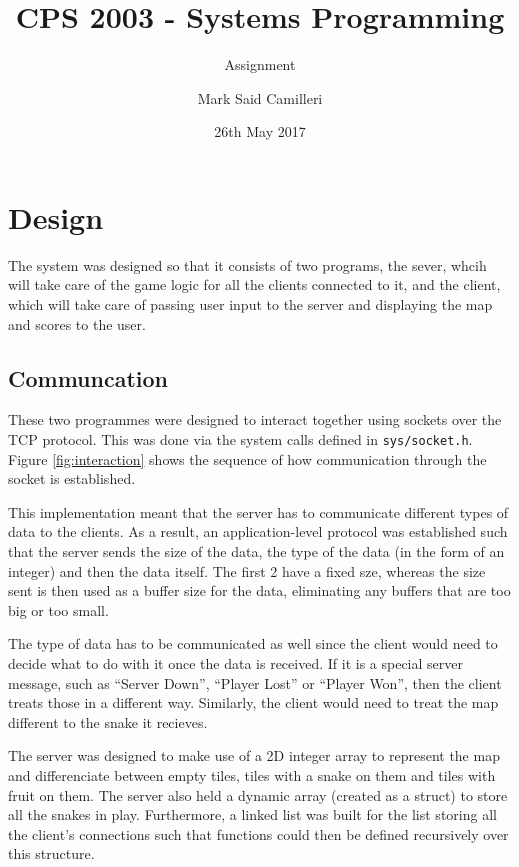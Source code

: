 \documentclass[programming,a4paper,12pt,twosided]{myassignment}
\title{CPS 2003 - Systems Programming}
\subtitle{Assignment}
\author{Mark Said Camilleri}
\date{26th May 2017}
\begin{document}
\maketitle
{}
\tableofcontents
\chapter{Design}
The system was designed so that it consists of two programs, the sever, whcih will take care of the game logic for all the clients connected to it, and the client, which will take care of passing user input to the server and displaying the map and scores to the user.
\section{Communcation}
These two programmes were designed to interact together using sockets over the TCP protocol. This was done via the system calls defined in \verb|sys/socket.h|. Figure \ref{fig:interaction} shows the sequence of how communication through the socket is established.

This implementation meant that the server has to communicate different types of data to the clients. As a result, an application-level protocol was established such that the server sends the size of the data, the type of the data (in the form of an integer) and then the data itself. The first 2 have a fixed sze, whereas the size sent is then used as a buffer size for the data, eliminating any buffers that are too big or too small.

The type of data has to be communicated as well since the client would need to decide what to do with it once the data is received. If it is a special server message, such as ``Server Down'', ``Player Lost'' or ``Player Won'', then the client treats those in a different way. Similarly, the client would need to treat the map different to the snake it recieves.

The server was designed to make use of a 2D integer array to represent the map and differenciate between empty tiles, tiles with a snake on them and tiles with fruit on them. The server also held a dynamic array (created as a struct) to store all the snakes in play. Furthermore, a linked list was built for the list storing all the client's connections such that functions could then be defined recursively over this structure. 
\end{document}
